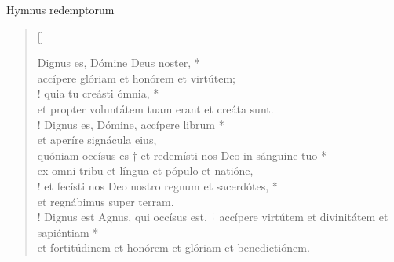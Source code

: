 


\def\greinitialformat#1{%
{\fontsize{39}{39}\selectfont #1}%
}




\vspace{0.3cm}
\begin{center}
Hymnus redemptorum\\
\end{center}

\begin{verse}[\versewidth]

Dignus es, Dómine Deus noster, *\\
accípere glóriam et honórem et virtútem;\\!
\vin quia tu creásti ómnia, *\\
\vin et propter voluntátem tuam erant et creáta sunt.\\!
Dignus es, Dómine, accípere librum *\\
et aperíre signácula eius,\\
\vin quóniam occísus es †
et redemísti nos Deo in sánguine tuo *\\
\vin ex omni tribu et língua et pópulo et natióne,\\!
et fecísti nos Deo nostro regnum et sacerdótes, *\\
et regnábimus super terram.\\!
\vin Dignus est Agnus, qui occísus est, †
accípere virtútem et divinitátem et sapiéntiam *\\
\vin et fortitúdinem et honórem et glóriam
	et benedictiónem.\\
\end{verse}
\vspace{1cm}

\newpage
